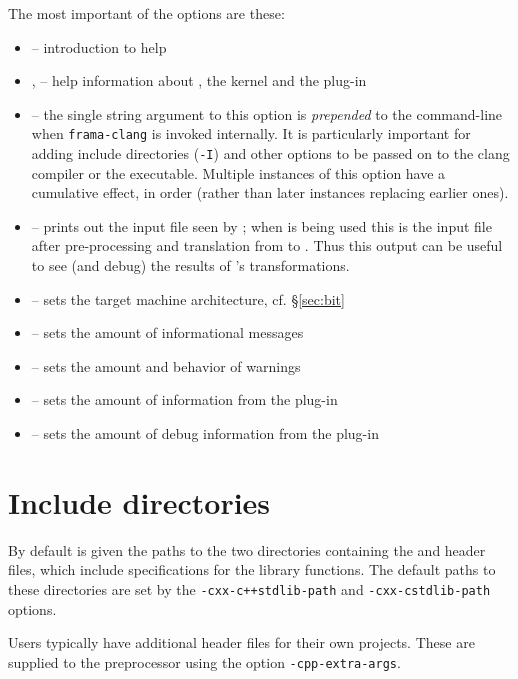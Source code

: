 The most important of the options are these:
\begin{itemize}
\item {} -- introduction to \framac help
    \item {},  -- help information about \fc, the \fc kernel and the \fcl plug-in
	\item {} -- the single string argument to this option is \textit{prepended} to the command-line when 
	\lstinline|frama-clang| is invoked internally. It is particularly 
	important for adding include directories (\lstinline|-I|) and
	other options to be passed on to the clang compiler or the \irg executable. 
	Multiple instances of this option have a cumulative effect, in order (rather
	than later instances replacing earlier ones).
    \item {} -- prints out the input file seen by \fc; when \fcl is being used this is the input file after pre-processing and translation from \cpp to \C. Thus this output can be useful to see (and debug) the results of \fcl's transformations.
	\item {} -- sets the target machine architecture, cf. \S\ref{sec:bit}
	\item {} -- sets the amount of informational messages
	\item {} -- sets the amount and behavior of warnings
	\item {} -- sets the amount of information from the \fclang plug-in
	\item {} -- sets the amount of debug information from the \fclang plug-in
\end{itemize}

\section{Include directories}

By default \irg is given the paths to the two directories containing the \fcl and \fc header files, which include \acslpp specifications for the \cpp library functions. The default paths to these directories are set by the \lstinline|-cxx-c++stdlib-path| and \lstinline|-cxx-cstdlib-path| options.

Users typically have additional header files for their own projects. These are supplied to the \fcl preprocessor using the option \lstinline|-cpp-extra-args|.

